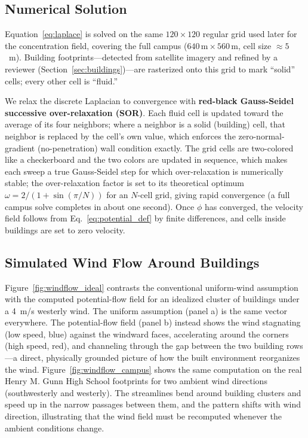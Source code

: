 \documentclass[11pt]{article}
\begin{document}
\subsection{Numerical Solution}

Equation~\eqref{eq:laplace} is solved on the same $120 \times 120$ regular grid used later for the concentration field, covering the full campus ($640\,\text{m} \times 560\,\text{m}$, cell size $\approx 5$~m). Building footprints---detected from satellite imagery and refined by a reviewer (Section~\ref{sec:buildings})---are rasterized onto this grid to mark ``solid'' cells; every other cell is ``fluid.''

We relax the discrete Laplacian to convergence with \textbf{red-black Gauss-Seidel successive over-relaxation (SOR)}. Each fluid cell is updated toward the average of its four neighbors; where a neighbor is a solid (building) cell, that neighbor is replaced by the cell's own value, which enforces the zero-normal-gradient (no-penetration) wall condition exactly. The grid cells are two-colored like a checkerboard and the two colors are updated in sequence, which makes each sweep a true Gauss-Seidel step for which over-relaxation is numerically stable; the over-relaxation factor is set to its theoretical optimum $\omega = 2/\!\left(1 + \sin(\pi/N)\right)$ for an $N$-cell grid, giving rapid convergence (a full campus solve completes in about one second). Once $\phi$ has converged, the velocity field follows from Eq.~\eqref{eq:potential_def} by finite differences, and cells inside buildings are set to zero velocity.

\subsection{Simulated Wind Flow Around Buildings}
\label{sec:windresults}

Figure~\ref{fig:windflow_ideal} contrasts the conventional uniform-wind assumption with the computed potential-flow field for an idealized cluster of buildings under a 4~m/s westerly wind. The uniform assumption (panel a) is the same vector everywhere. The potential-flow field (panel b) instead shows the wind stagnating (low speed, blue) against the windward faces, accelerating around the corners (high speed, red), and channeling through the gap between the two building rows---a direct, physically grounded picture of how the built environment reorganizes the wind. Figure~\ref{fig:windflow_campus} shows the same computation on the real Henry M. Gunn High School footprints for two ambient wind directions (southwesterly and westerly). The streamlines bend around building clusters and speed up in the narrow passages between them, and the pattern shifts with wind direction, illustrating that the wind field must be recomputed whenever the ambient conditions change.
\end{document}
